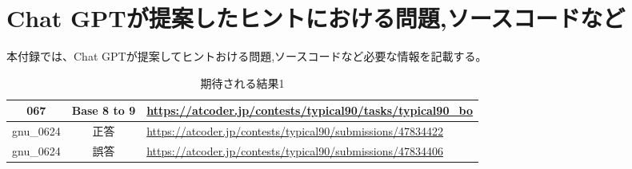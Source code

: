 \chapter{Chat GPTが提案したヒントにおける問題,ソースコードなど}

本付録では、Chat GPTが提案してヒントおける問題,ソースコードなど必要な情報を記載する。

\begin{table}[h]
    \centering
    \caption{期待される結果1}
    \label{tab:67}
    \begin{adjustbox}{center}
    \begin{tabular}{|c|c|p{10cm}|}%
        \hline
        067 & Base 8 to 9 & \url{https://atcoder.jp/contests/typical90/tasks/typical90_bo} \\ \hline
        gnu\_0624 &正答 & \url{https://atcoder.jp/contests/typical90/submissions/47834422} \\ \hline
        gnu\_0624 &誤答
        & \url{https://atcoder.jp/contests/typical90/submissions/47834406} \\ \hline
    \end{tabular}
    \end{adjustbox}
\end{table}



